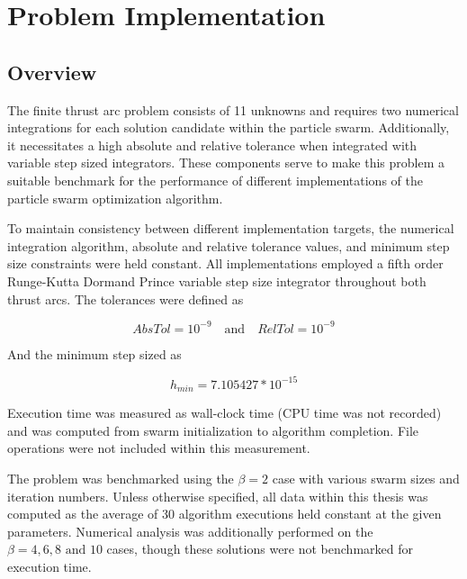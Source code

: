 \chapter{Problem Implementation}
\section{Overview}
\noindent The finite thrust arc problem consists of 11 unknowns and requires two numerical integrations for each solution candidate within the
particle swarm. Additionally, it necessitates a high absolute and relative tolerance when integrated with variable step sized integrators. These
components serve to make this problem a suitable benchmark for the performance of different implementations of the particle swarm optimization algorithm. \newline

\noindent To maintain consistency between different implementation targets, the numerical integration algorithm, absolute and relative tolerance values,
and minimum step size constraints were held constant. All implementations employed a fifth order Runge-Kutta Dormand Prince variable step size integrator
throughout both thrust arcs. The tolerances were defined as

\begin{equation}
AbsTol = 10^{-9} \quad \text{and} \quad RelTol = 10^{-9} 
\label{eq:tolerances}
\end{equation}

\noindent And the minimum step sized as 

\begin{equation}
    h_{min} = 7.105427*10^{-15}
    \label{eq:min-step-size}
\end{equation}

\noindent Execution time was measured as wall-clock time (CPU time was not recorded) and was computed from swarm initialization 
to algorithm completion. File operations were not included within this measurement. \newline

\noindent The problem was benchmarked using the $\beta = 2$ case with various swarm sizes and iteration numbers. Unless otherwise 
specified, all data within this thesis was computed as the average of 30 algorithm executions held constant at the given parameters. 
Numerical analysis was additionally performed on the $\beta=4,6,8 \text{ and } 10$ cases, though these solutions were not benchmarked for execution time.

